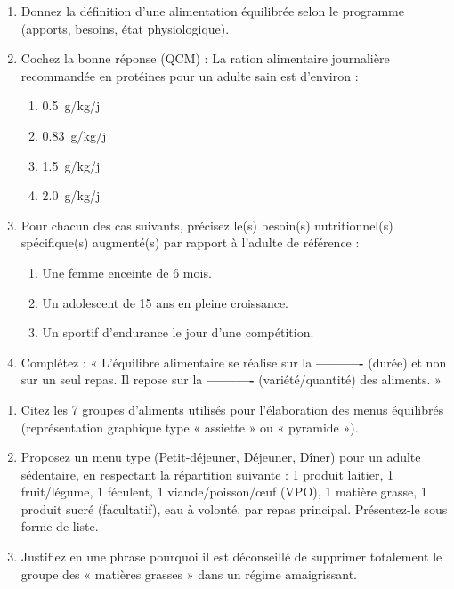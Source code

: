 \documentclass[11pt]{article}
\begin{document}
\begin{exercice}
\begin{enumerate}
    \item Donnez la définition d'une alimentation équilibrée selon le programme (apports, besoins, état physiologique).
    \item Cochez la bonne réponse (QCM) : La ration alimentaire journalière recommandée en protéines pour un adulte sain est d'environ :
    \begin{enumerate}
        \item \SI{0,5}{g/kg/j}
        \item \SI{0,83}{g/kg/j}
        \item \SI{1,5}{g/kg/j}
        \item \SI{2,0}{g/kg/j}
    \end{enumerate}
    \item Pour chacun des cas suivants, précisez le(s) besoin(s) nutritionnel(s) spécifique(s) augmenté(s) par rapport à l'adulte de référence :
    \begin{enumerate}
        \item Une femme enceinte de 6 mois.
        \item Un adolescent de 15 ans en pleine croissance.
        \item Un sportif d'endurance le jour d'une compétition.
    \end{enumerate}
    \item Complétez : « L'équilibre alimentaire se réalise sur la \textbf{----------} (durée) et non sur un seul repas. Il repose sur la \textbf{----------} (variété/quantité) des aliments. »
\end{enumerate}
\end{exercice}

\begin{exercice}
\begin{enumerate}
    \item Citez les 7 groupes d'aliments utilisés pour l'élaboration des menus équilibrés (représentation graphique type « assiette » ou « pyramide »).
    \item Proposez un menu type (Petit-déjeuner, Déjeuner, Dîner) pour un adulte sédentaire, en respectant la répartition suivante : 1 produit laitier, 1 fruit/légume, 1 féculent, 1 viande/poisson/œuf (VPO), 1 matière grasse, 1 produit sucré (facultatif), eau à volonté, par repas principal. Présentez-le sous forme de liste.
    \item Justifiez en une phrase pourquoi il est déconseillé de supprimer totalement le groupe des « matières grasses » dans un régime amaigrissant.
\end{enumerate}
\end{exercice}
\end{document}
